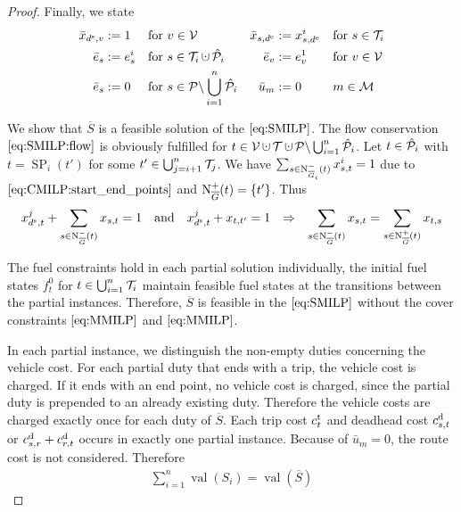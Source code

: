 \begin{proof}
Finally, we state
\begin{align*}
	\bar{x}_{\ds,v} & := 1 && \text{for } v\in\mathcal{V} & \bar{x}_{s,\de} & := x^i_{s,\de} && \text{for } s\in\Ti \\
	\bar{e}_s & := e^i_s && \text{for } s\in\Ti\cupdot\Phat_i & \bar{e}_v & := e^1_v && \text{for } v\in\mathcal{V} \\
	\bar{e}_s & := 0 && \text{for } s\in\mathcal{P}\backslash\Cupdot_{i=1}^n \Phat_i & \bar{u}_m & := 0 && m\in\mathcal{M} \\
\end{align*}

We show that $\overline{S}$ is a feasible solution of the $\eqref{eq:SMILP}$. The flow conservation $\eqref{eq:SMILP:flow}$ is obviously fulfilled for ${t\in\mathcal{V}\cupdot\mathcal{T}\cupdot\mathcal{P}\backslash\Cupdot_{i=1}^n \Phat_i}$. Let ${t\in\hat{\mathcal{P}}_i}$ with ${t=\operatorname{SP}_i\left(t'\right)}$ for some ${t'\in\bigcup_{j=i+1}^n \mathcal{T}_j}$. We have ${\sum_{s\in\operatorname{N}_{\overline{G}_i}^-(t)} x^i_{s,t} = 1}$ due to $\eqref{eq:CMILP:start_end_points}$ and $\operatorname{N}_{\overline{G}}^+(t) = \left\{t'\right\}$. Thus
\begin{align*}
	x^j_{d^{\operatorname{s}},t} + \sum_{s\in\operatorname{N}_{\overline{G}}^-(t)} x_{s,t} = 1 && \text{and} && x^j_{d^{\operatorname{s}},t} + x_{t,t'} = 1 && \Rightarrow && \sum_{s\in\operatorname{N}_{\overline{G}}^-(t)} x_{s,t} = \sum_{s\in\operatorname{N}_{\overline{G}}^+(t)} x_{t,s}
\end{align*}

The fuel constraints hold in each partial solution individually, the initial fuel states $f^0_t$ for ${t\in\bigcup_{i=1}^n \mathcal{T}_i}$ maintain feasible fuel states at the transitions between the partial instances. Therefore, $\overline{S}$ is feasible in the $\eqref{eq:SMILP}$ without the cover constraints $\eqref{eq:MMILP}$ and $\eqref{eq:MMILP}$.

In each partial instance, we distinguish the non-empty duties concerning the vehicle cost. For each partial duty that ends with a trip, the vehicle cost is charged. If it ends with an end point, no vehicle cost is charged, since the partial duty is prepended to an already existing duty. Therefore the vehicle costs are charged exactly once for each duty of $\overline{S}$. Each trip cost $c^{\operatorname{t}}_t$ and deadhead cost $c^{\operatorname{d}}_{s,t}$ or ${c^{\operatorname{d}}_{s,r}+c^{\operatorname{d}}_{r,t}}$ occurs in exactly one partial instance. Because of ${\bar{u}_m=0}$, the route cost is not considered. Therefore
\begin{align*}
	\sum_{i=1}^n\operatorname{val}\left(S_i\right) = \operatorname{val}\left(\overline{S}\right)
\end{align*}

\end{proof}

